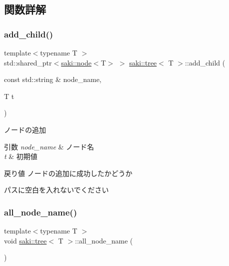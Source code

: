 \subsection{関数詳解}
\mbox{\label{classsaki_1_1tree_a075bd07afce11ff91ffa6d200dbf6282}} 
\subsubsection{\texorpdfstring{add\+\_\+child()}{add\_child()}}
{\footnotesize\ttfamily template$<$typename T $>$ \\
std\+::shared\+\_\+ptr$<$\mbox{\hyperlink{classsaki_1_1node}{saki\+::node}}$<$T$>$ $>$ \mbox{\hyperlink{classsaki_1_1tree}{saki\+::tree}}$<$ T $>$\+::add\+\_\+child (\begin{DoxyParamCaption}\item[{const std\+::string \&}]{node\+\_\+name,  }\item[{T}]{t }\end{DoxyParamCaption})\hspace{0.3cm}{\ttfamily [inline]}}



ノードの追加 


\begin{DoxyParams}{引数}
{\em node\+\_\+name} & ノード名 \\
\hline
{\em t} & 初期値 \\
\hline
\end{DoxyParams}
\begin{DoxyReturn}{戻り値}
ノードの追加に成功したかどうか
\end{DoxyReturn}
パスに空白を入れないでください \mbox{\label{classsaki_1_1tree_a1ae83219f556f066db0ab5307c1a46d6}} 
\subsubsection{\texorpdfstring{all\+\_\+node\+\_\+name()}{all\_node\_name()}}
{\footnotesize\ttfamily template$<$typename T $>$ \\
void \mbox{\hyperlink{classsaki_1_1tree}{saki\+::tree}}$<$ T $>$\+::all\+\_\+node\+\_\+name (\begin{DoxyParamCaption}{ }\end{DoxyParamCaption})\hspace{0.3cm}{\ttfamily [inline]}}



